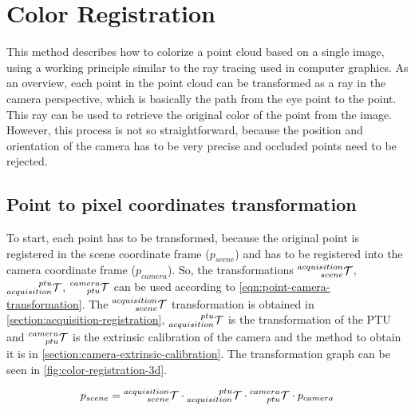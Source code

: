 \section{Color Registration}
\label{section:color-registration}

This method describes how to colorize a point cloud based on a single image, using a working principle similar to the ray tracing used in computer graphics. As an overview, each point in the point cloud can be transformed as a ray in the camera perspective, which is basically the path from the eye point to the point. This ray can be used to retrieve the original color of the point from the image. However, this process is not so straightforward, because the position and orientation of the camera has to be very precise and occluded points need to be rejected.

\subsection{Point to pixel coordinates transformation}

To start, each point has to be transformed, because the original point is registered in the scene coordinate frame ($p_{scene}$) and has to be registered into the camera coordinate frame ($p_{camera}$). So, the transformations $\prescript{acquisition}{scene}{\mathcal{T}}$, $\prescript{ptu}{acquisition}{\mathcal{T}}$, $\prescript{camera}{ptu}{\mathcal{T}}$ can be used according to \cref{eqn:point-camera-transformation}. The $\prescript{acquisition}{scene}{\mathcal{T}}$ transformation is obtained in \cref{section:acquisition-registration}, $\prescript{ptu}{acquisition}{\mathcal{T}}$ is the transformation of the PTU and $\prescript{camera}{ptu}{\mathcal{T}}$ is the extrinsic calibration of the camera and the method to obtain it is in \cref{section:camera-extrinsic-calibration}. The transformation graph can be seen in \cref{fig:color-registration-3d}.

\begin{equation}
    \label{eqn:point-camera-transformation}
    p_{scene} =
        \prescript{acquisition}{scene}{\mathcal{T}} \cdot 
        \prescript{ptu}{acquisition}{\mathcal{T}} \cdot
        \prescript{camera}{ptu}{\mathcal{T}} \cdot p_{camera}
\end{equation}


